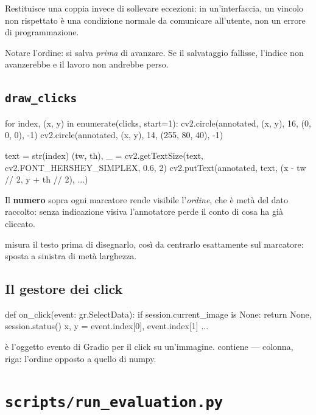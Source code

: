 Restituisce una coppia  invece di sollevare eccezioni: in
un'interfaccia, un vincolo non rispettato è una condizione normale da comunicare all'utente, non
un errore di programmazione.

Notare l'ordine: si salva \emph{prima} di avanzare. Se il salvataggio fallisse, l'indice non
avanzerebbe e il lavoro non andrebbe perso.

\subsection{\texttt{draw\_clicks}}

\begin{idebox}
\begin{pycode}
for index, (x, y) in enumerate(clicks, start=1):
    cv2.circle(annotated, (x, y), 16, (0, 0, 0), -1)
    cv2.circle(annotated, (x, y), 14, (255, 80, 40), -1)

    text = str(index)
    (tw, th), _ = cv2.getTextSize(text, cv2.FONT_HERSHEY_SIMPLEX, 0.6, 2)
    cv2.putText(annotated, text, (x - tw // 2, y + th // 2), ...)
\end{pycode}
\end{idebox}

Il \textbf{numero} sopra ogni marcatore rende visibile l'\emph{ordine}, che è metà del dato
raccolto: senza indicazione visiva l'annotatore perde il conto di cosa ha già cliccato.

 misura il testo prima di disegnarlo, così da centrarlo esattamente sul
marcatore:  sposta a sinistra di metà larghezza.

\subsection{Il gestore dei click}

\begin{idebox}
\begin{pycode}
def on_click(event: gr.SelectData):
    if session.current_image is None:
        return None, session.status()
    x, y = event.index[0], event.index[1]
    ...
\end{pycode}
\end{idebox}

 è l'oggetto evento di Gradio per il click su un'immagine.
 contiene \pyin{[x, y]} --- colonna, riga: l'ordine opposto a quello di numpy.

\section{\texttt{scripts/run\_evaluation.py}}

